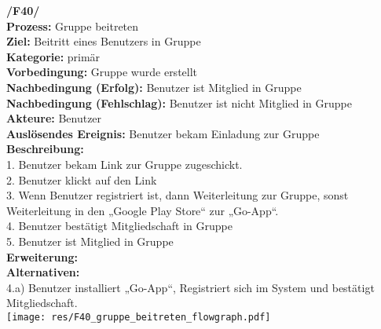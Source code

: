 \textbf{/F40/} \\
\textbf{Prozess:} Gruppe beitreten \\
\textbf{Ziel:} Beitritt eines Benutzers in Gruppe\\
\textbf{Kategorie:} primär \\
\textbf{Vorbedingung:} Gruppe wurde erstellt\\
\textbf{Nachbedingung (Erfolg):} Benutzer ist Mitglied in Gruppe\\
\textbf{Nachbedingung (Fehlschlag):} Benutzer ist nicht Mitglied in Gruppe\\
\textbf{Akteure:} Benutzer\\
\textbf{Auslösendes Ereignis:} Benutzer bekam Einladung zur Gruppe\\
\textbf{Beschreibung:} \\
1. Benutzer bekam Link zur Gruppe zugeschickt.\\
2. Benutzer klickt auf den Link \\
3. Wenn Benutzer registriert ist, dann Weiterleitung zur Gruppe, sonst Weiterleitung in den „Google Play Store“ zur „Go-App“.\\
4. Benutzer bestätigt Mitgliedschaft in Gruppe\\
5. Benutzer ist Mitglied in Gruppe\\
\textbf{Erweiterung:} \\
\textbf{Alternativen:} \\
4.a) Benutzer installiert „Go-App“, Registriert sich im System und bestätigt Mitgliedschaft.\\

\texttt{[image: res/F40\_gruppe\_beitreten\_flowgraph.pdf]}
